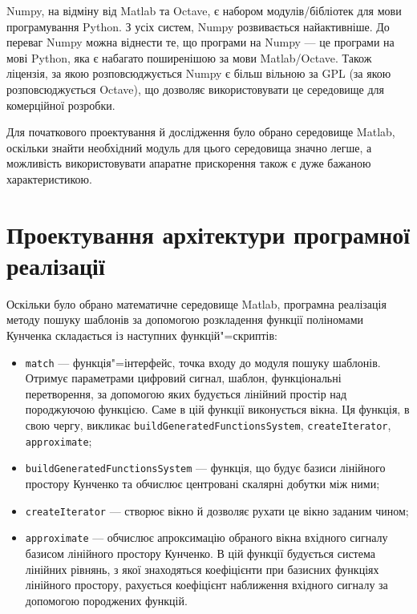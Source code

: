     Numpy, на відміну від Matlab та Octave, є набором модулів/бібліотек для мови програмування Python.
    З усіх систем, Numpy розвивається найактивніше.
    До переваг Numpy можна віднести те, що програми на Numpy --- це програми на мові Python, яка є набагато
    поширенішою за мови Matlab/Octave.
    Також ліцензія, за якою розповсюджується Numpy є більш вільною за GPL (за якою розповсюджується Octave), що
    дозволяє використовувати це середовище для комерційної розробки.

    Для початкового проектування й дослідження було обрано середовище Matlab, оскільки знайти необхідний модуль для
    цього середовища значно легше, а можливість використовувати апаратне прискорення також є дуже бажаною
    характеристикою.
\section{Проектування архітектури програмної реалізації}
    Оскільки було обрано математичне середовище Matlab, програмна реалізація методу пошуку шаблонів за допомогою
    розкладення функції поліномами Кунченка складається із наступних функцій"=скриптів:
    \begin{itemize}
        \item \verb'match' --- функція"=інтерфейс, точка входу до модуля пошуку шаблонів.
            Отримує параметрами цифровий сигнал, шаблон, функціональні перетворення, за допомогою яких будується
            лінійний простір над породжуючою функцією.
            Саме в цій функції виконується  вікна.
            Ця функція, в свою чергу, викликає \verb'buildGeneratedFunctionsSystem', \verb'createIterator',
            \verb'approximate';
        \item \verb'buildGeneratedFunctionsSystem' --- функція, що будує базиси лінійного простору Кунченко та
            обчислює центровані скалярні добутки між ними;
        \item \verb'createIterator' --- створює вікно й дозволяє рухати це вікно заданим чином;
        \item \verb'approximate' --- обчислює апроксимацію обраного вікна вхідного сигналу базисом лінійного простору
            Кунченко.
            В цій функції будується система лінійних рівнянь, з якої знаходяться коефіцієнти при базисних функціях
            лінійного простору, рахується коефіцієнт наближення вхідного сигналу за допомогою породжених функцій.
    \end{itemize}

